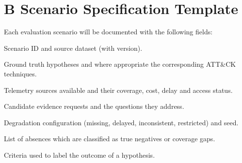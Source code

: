 \documentclass[a4paper,11pt]{article}
\begin{document}
\section*{B Scenario Specification Template}
Each evaluation scenario will be documented with the following fields:\par
Scenario ID and source dataset (with version).\par
Ground truth hypotheses and where appropriate the corresponding ATT\&CK techniques.\par
Telemetry sources available and their coverage, cost, delay and access status.\par
Candidate evidence requests and the questions they address.\par
Degradation configuration (missing, delayed, inconsistent, restricted) and seed.\par
List of absences which are classified as true negatives or coverage gaps.\par
Criteria used to label the outcome of a hypothesis.\par
\end{document}
